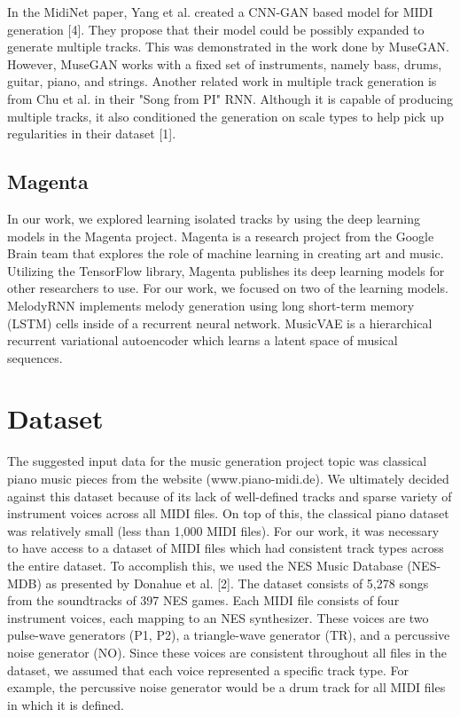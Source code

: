 \documentclass{article}
\begin{document}
In the MidiNet paper, Yang et al. created a CNN-GAN based model for MIDI generation [4]. They propose that their model could be possibly expanded to generate multiple tracks. This was demonstrated in the work done by MuseGAN. However, MuseGAN works with a fixed set of instruments, namely bass, drums, guitar, piano, and strings. Another related work in multiple track generation is from Chu et al. in their "Song from PI" RNN. Although it is capable of producing multiple tracks, it also conditioned the generation on scale types to help pick up regularities in their dataset [1].

\subsection{Magenta}

In our work, we explored learning isolated tracks by using the deep learning models in the Magenta project. Magenta is a research project from the Google Brain team that explores the role of machine learning in creating art and music. Utilizing the TensorFlow library, Magenta publishes its deep learning models for other researchers to use. For our work, we focused on two of the learning models. MelodyRNN implements melody generation using long short-term memory (LSTM) cells inside of a recurrent neural network. MusicVAE is a hierarchical recurrent variational autoencoder which learns a latent space of musical sequences.


\section{Dataset}

The suggested input data for the music generation project topic was classical piano music pieces from the website (www.piano-midi.de). We ultimately decided against this dataset because of its lack of well-defined tracks and sparse variety of instrument voices across all MIDI files. On top of this, the classical piano dataset was relatively small (less than 1,000 MIDI files). For our work, it was necessary to have access to a dataset of MIDI files which had consistent track types across the entire dataset. To accomplish this, we used the NES Music Database (NES-MDB) as presented by Donahue et al. [2]. The dataset consists of 5,278 songs from the soundtracks of 397 NES games. Each MIDI file consists of four instrument voices, each mapping to an NES synthesizer. These voices are two pulse-wave generators (P1, P2), a triangle-wave generator (TR), and a percussive noise generator (NO). Since these voices are consistent throughout all files in the dataset, we assumed that each voice represented a specific track type. For example, the percussive noise generator would be a drum track for all MIDI files in which it is defined.
\end{document}
